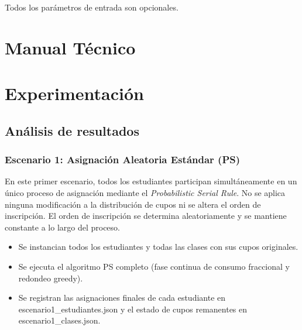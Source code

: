 \documentclass{article}
\begin{document}
Todos los parámetros de entrada son opcionales.



\section{Manual Técnico}\label{sec:man_t}



\section{Experimentación}\label{sec:exp}

\subsection{Análisis de resultados}

\subsubsection{Escenario 1: Asignación Aleatoria Estándar (PS)}
En este primer escenario, todos los estudiantes participan simultáneamente en un único
 proceso de asignación mediante el \emph{Probabilistic Serial Rule}. No se aplica 
 ninguna modificación a la distribución de cupos ni se altera el orden de inscripción.
 El orden de inscripción se determina aleatoriamente y se mantiene constante a lo largo
  del proceso.

\begin{itemize}
\item Se instancian todos los estudiantes y todas las clases con sus cupos originales.
\item Se ejecuta el algoritmo PS completo (fase continua de consumo fraccional y 
redondeo greedy).
\item Se registran las asignaciones finales de cada estudiante en escenario1\_estudiantes.json y 
 el estado de cupos remanentes en escenario1\_clases.json.
\end{itemize}
\end{document}

